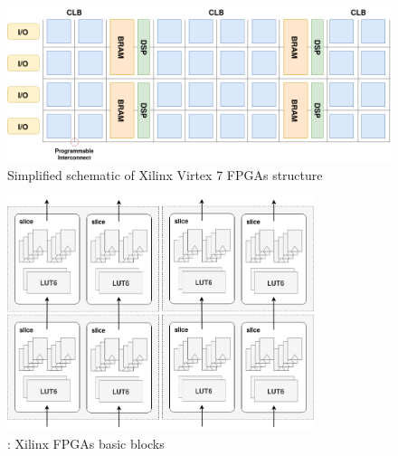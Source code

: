             \begin{figure}[h!]
                \centering
                \includegraphics[width=1.0\textwidth]{Figures/FPGA-Structure.png}
                \caption[Xilinx Virtex 7 FPGAs structure]{Simplified schematic of Xilinx Virtex 7 FPGAs structure}
                \label{ch.problem:sec.hardware:ssec.fpga:sssec.fpga:fig.structure}
            \end{figure}
            \begin{figure}[h!]
                \centering
                \includegraphics[width=0.8\textwidth]{Figures/FPGA-CLB.png}
                \caption[Xilinx Configurable Logic Blocks]{: Xilinx FPGAs basic blocks}
                \label{ch.problem:sec.hardware:ssec.fpga:sssec.fpga:fig.clb}
            \end{figure}

